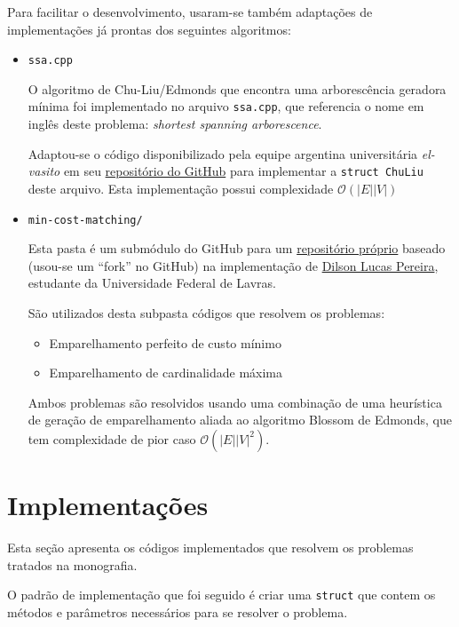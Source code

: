 Para facilitar o desenvolvimento, usaram-se também adaptações de implementações já prontas dos seguintes algoritmos:

\begin{itemize}
    \item \texttt{ssa.cpp}

        O algoritmo de Chu-Liu/Edmonds que encontra uma arborescência geradora mínima foi implementado no arquivo \texttt{ssa.cpp}, que referencia o nome em inglês deste problema: \textit{shortest spanning arborescence}.

        Adaptou-se o código disponibilizado pela equipe argentina universitária \textit{el-vasito} em seu \href{https://github.com/mhunicken/icpc-team-notebook-el-vasito}{repositório do GitHub} para implementar a \texttt{struct ChuLiu} deste arquivo.
        Esta implementação possui complexidade $\mathcal{O}(|E||V|)$

    \item \texttt{min-cost-matching/}

        Esta pasta é um submódulo do GitHub para um \href{https://github.com/gafeol/Minimum-Cost-Perfect-Matching}{repositório próprio} baseado (usou-se um ``fork'' no GitHub) na implementação de \href{https://github.com/dilsonpereira/Minimum-Cost-Perfect-Matching}{Dilson Lucas Pereira}, estudante da Universidade Federal de Lavras.

        São utilizados desta subpasta códigos que resolvem os problemas:
        \begin{itemize}
            \item Emparelhamento perfeito de custo mínimo 
            \item Emparelhamento de cardinalidade máxima
        \end{itemize}

        Ambos problemas são resolvidos usando uma combinação de uma heurística de geração de emparelhamento aliada ao algoritmo Blossom de Edmonds, que tem complexidade de pior caso $\mathcal{O}(|E||V|^2)$.

\end{itemize}

\section{Implementações}

Esta seção apresenta os códigos implementados que resolvem os problemas tratados na monografia.

O padrão de implementação que foi seguido é criar uma \texttt{struct} que contem os métodos e parâmetros necessários para se resolver o problema.

